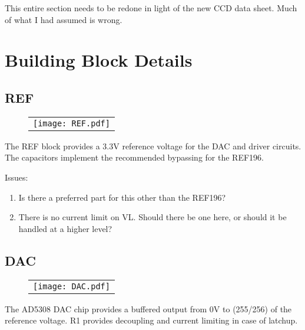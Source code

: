 \documentclass[a4paper,12pt]{article}
\begin{document}



This entire section needs to be redone in light of the new CCD data sheet. Much of what I had assumed is wrong.


\section{Building Block Details}
\subsection{REF}
   \begin{figure}
   \begin{center}
   \begin{tabular}{c}
   \texttt{[image: REF.pdf]}
   \end{tabular}
   \end{center}
   \end{figure}

The REF block provides a 3.3V reference voltage for the DAC and driver circuits. The capacitors implement the recommended bypassing for the REF196.

Issues:
\begin{enumerate}
\item
Is there a preferred part for this other than the REF196?
\item
There is no current limit on VL. Should there be one here, or should it be handled at a higher level?
\end{enumerate}

\subsection{DAC}
   \begin{figure}
   \begin{center}
   \begin{tabular}{c}
   \texttt{[image: DAC.pdf]}
   \end{tabular}
   \end{center}
   \end{figure}
The AD5308 DAC chip provides a buffered output from 0V to (255/256) of the reference voltage. R1 provides decoupling and current limiting in case of latchup.
\end{document}
